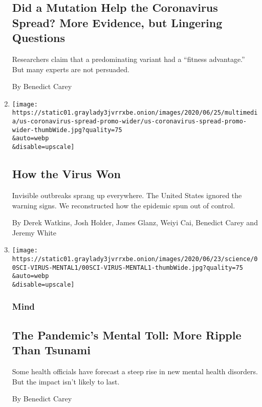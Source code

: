 \begin{enumerate}
  \hypertarget{did-a-mutation-help-the-coronavirus-spread-more-evidence-but-lingering-questions}{%
  \subsection{Did a Mutation Help the Coronavirus Spread? More Evidence,
  but Lingering
  Questions}\label{did-a-mutation-help-the-coronavirus-spread-more-evidence-but-lingering-questions}}

  Researchers claim that a predominating variant had a ``fitness
  advantage.'' But many experts are not persuaded.

  By Benedict Carey
\item
  \href{/interactive/2020/us/coronavirus-spread.html}{}

  \texttt{[image: https://static01.graylady3jvrrxbe.onion/images/2020/06/25/multimedia/us-coronavirus-spread-promo-wider/us-coronavirus-spread-promo-wider-thumbWide.jpg?quality=75\\\&auto=webp\\\&disable=upscale]}

  \hypertarget{how-the-virus-won}{%
  \subsection{How the Virus Won}\label{how-the-virus-won}}

  Invisible outbreaks sprang up everywhere. The United States ignored
  the warning signs. We reconstructed how the epidemic spun out of
  control.

  By Derek Watkins, Josh Holder, James Glanz, Weiyi Cai, Benedict Carey
  and Jeremy White
\item
  \href{/2020/06/21/health/coronavirus-mental-health-anxiety.html}{}

  \texttt{[image: https://static01.graylady3jvrrxbe.onion/images/2020/06/23/science/00SCI-VIRUS-MENTAL1/00SCI-VIRUS-MENTAL1-thumbWide.jpg?quality=75\\\&auto=webp\\\&disable=upscale]}

  \hypertarget{mind}{%
  \subsubsection{Mind}\label{mind}}

  \hypertarget{the-pandemics-mental-toll-more-ripple-than-tsunami}{%
  \subsection{The Pandemic's Mental Toll: More Ripple Than
  Tsunami}\label{the-pandemics-mental-toll-more-ripple-than-tsunami}}

  Some health officials have forecast a steep rise in new mental health
  disorders. But the impact isn't likely to last.

  By Benedict Carey
\end{enumerate}

